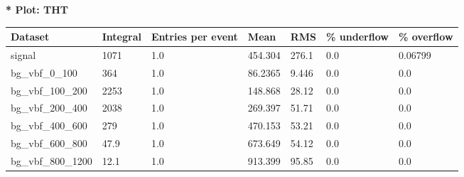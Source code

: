 \documentclass[a4paper, 10pt]{article}
\begin{document}
\textbf{* Plot: THT}\\
   \begin{table}[H]
  \begin{center}
    \begin{tabular}{|m{23.0mm}|m{23.0mm}|m{18.0mm}|m{19.0mm}|m{19.0mm}|m{19.0mm}|m{19.0mm}|}
      \hline
      {\cellcolor{yellow}         Dataset}& {\cellcolor{yellow}         Integral}& {\cellcolor{yellow}         Entries per event}& {\cellcolor{yellow}         Mean}& {\cellcolor{yellow}         RMS}& {\cellcolor{yellow}         \% underflow}& {\cellcolor{yellow}         \% overflow}\\
      \hline
      {\cellcolor{white}         signal}& {\cellcolor{white}         1071}& {\cellcolor{white}         1.0}& {\cellcolor{white}         454.304}& {\cellcolor{white}         276.1}& {\cellcolor{green}         0.0}& {\cellcolor{green}         0.06799}\\
      \hline
      {\cellcolor{white}         bg\_vbf\_0\_100}& {\cellcolor{white}         364}& {\cellcolor{white}         1.0}& {\cellcolor{white}         86.2365}& {\cellcolor{white}         9.446}& {\cellcolor{green}         0.0}& {\cellcolor{green}         0.0}\\
      \hline
      {\cellcolor{white}         bg\_vbf\_100\_200}& {\cellcolor{white}         2253}& {\cellcolor{white}         1.0}& {\cellcolor{white}         148.868}& {\cellcolor{white}         28.12}& {\cellcolor{green}         0.0}& {\cellcolor{green}         0.0}\\
      \hline
      {\cellcolor{white}         bg\_vbf\_200\_400}& {\cellcolor{white}         2038}& {\cellcolor{white}         1.0}& {\cellcolor{white}         269.397}& {\cellcolor{white}         51.71}& {\cellcolor{green}         0.0}& {\cellcolor{green}         0.0}\\
      \hline
      {\cellcolor{white}         bg\_vbf\_400\_600}& {\cellcolor{white}         279}& {\cellcolor{white}         1.0}& {\cellcolor{white}         470.153}& {\cellcolor{white}         53.21}& {\cellcolor{green}         0.0}& {\cellcolor{green}         0.0}\\
      \hline
      {\cellcolor{white}         bg\_vbf\_600\_800}& {\cellcolor{white}         47.9}& {\cellcolor{white}         1.0}& {\cellcolor{white}         673.649}& {\cellcolor{white}         54.12}& {\cellcolor{green}         0.0}& {\cellcolor{green}         0.0}\\
      \hline
      {\cellcolor{white}         bg\_vbf\_800\_1200}& {\cellcolor{white}         12.1}& {\cellcolor{white}         1.0}& {\cellcolor{white}         913.399}& {\cellcolor{white}         95.85}& {\cellcolor{green}         0.0}& {\cellcolor{green}         0.0}\\

\end{tabular}
\end{center}
\end{table}
\end{document}
